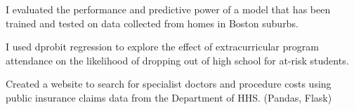 \documentclass[]{deedy-resume-openfont}
\begin{document}
\begin{minipage}[t]{0.66\textwidth}
\begin{tightemize}
\item I evaluated the performance and predictive power of a model that has been trained and tested on data collected from homes in Boston suburbs.
\end{tightemize}


\begin{tightemize}
\item I used dprobit regression to explore the effect of extracurricular program attendance on the likelihood of dropping out of high school for at-risk students.
\end{tightemize}


\begin{tightemize}
\item Created a website to search for specialist doctors and procedure costs using public insurance claims data from the Department of HHS. (Pandas, Flask)
\end{tightemize}


\end{minipage}
\end{document}
